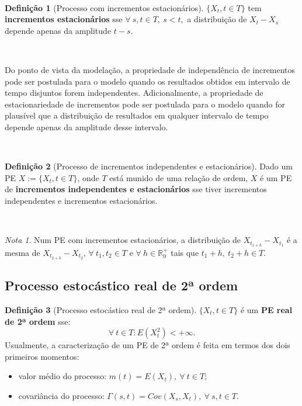 \documentclass[
  11pt,
  a4paper,
]{book}
\providecommand{\tightlist}{%
  \setlength{\itemsep}{0pt}\setlength{\parskip}{0pt}}
\theoremstyle{definition}
\newtheorem{definition}{Definição}[chapter]
\theoremstyle{definition}
\theoremstyle{definition}
\theoremstyle{definition}
\theoremstyle{remark}
\newtheorem*{remark}{Nota }
\begin{document}
\(\,\)

\begin{definition}[Processo com incrementos estacionários]
\(\{X_t, t \in T\}\) tem \textbf{incrementos estacionários} sse \(\forall ~s, t \in T, ~s<t,\) a
distribuição de \(X_t-X_s\) depende apenas da amplitude \(t-s\).
\end{definition}

\(\,\)

Do ponto de vista da modelação, a propriedade de independência de incrementos pode ser
postulada para o modelo quando os resultados obtidos em intervalo de tempo disjuntos forem
independentes. Adicionalmente, a propriedade de estacionariedade de incrementos pode ser
postulada para o modelo quando for plausível que a distribuição de resultados em qualquer
intervalo de tempo depende apenas da amplitude desse intervalo.

\(\,\)

\begin{definition}[Processo de incrementos independentes e estacionários]
Dado um PE \(X:=\{X_t, t \in T\}\), onde \(T\) está munido de uma relação de ordem, \(X\) é um PE
de \textbf{incrementos independentes e estacionários} sse tiver incrementos independentes e
incrementos estacionários.
\end{definition}

\(\,\)

\begin{remark}
Num PE com incrementos estacionários, a distribuição de \(X_{t_{1+h}}-X_{t_1}\) é a mesma de
\(X_{t_{2+h}}-X_{t_2}\), \(\forall ~ t_1,t_2 \in T\) e \(\forall ~ h \in \mathbb{R}_0^+\) tais que \(t_1+h, ~t_2+h \in T.\)
\end{remark}

\subsection{Processo estocástico real de 2ª ordem}\label{processo-estocastico-real-de-2-ordem}

\begin{definition}[Processo estocástico real de 2ª ordem]

\(\{X_t, t \in T\}\) é um \textbf{PE real de 2ª ordem} sse: \[\forall ~t \in T: E(X_t^2)<+\infty.\]
Usualmente, a caracterização de um PE de 2ª ordem é feita em termos dos dois primeiros
momentos:

\begin{itemize}
\tightlist
\item
  valor médio do processo: \(m(t)=E(X_t), ~\forall ~t \in T\);\\
\item
  covariância do processo: \(\Gamma(s,t)=Cov(X_s,X_t), ~\forall ~s,t \in T\).
\end{itemize}

\end{definition}
\end{document}
